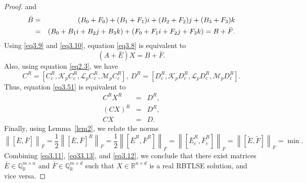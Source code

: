 \documentclass[10pt,a4paper]{amsart}
\def \QR{\mathbb{Q}_\mathbb{R}}
\def \R{{\mathbb R}}
\def \i{\textit{\textbf{i}}}
\def \j{\textit{\textbf{j}}}
\def \k{\textit{\textbf{k}}}
\newcommand\norm[1]{\left\lVert#1\right\rVert}
\begin{document}
\begin{proof}
	and
	\begin{eqnarray}
		\bar{B}&=& (B_0+ F_0)+ (B_1+ F_1)\i+ (B_2+ F_2)\j+ (B_3+ F_3)\k \nonumber\\
		&=& (B_0+ B_1\i+ B_2\j+ B_3\k)+ (F_0 + F_1\i+ F_2\j+ F_3\k) = B+ \bar{F}. \label{eq3.10}
	\end{eqnarray}
	Using \eqref{eq3.9} and \eqref{eq3.10}, equation \eqref{eq3.8} is equivalent to
	\begin{equation} \label{eq3.11}
		(A+\bar{E})X= B+ \bar{F}.
	\end{equation}
	Also, using equation \eqref{eq2.3}, we have
	\begin{equation*}
		C^R = \left[C^R_c, \mathcal{K}_p C^R_c, \mathcal{L}_p C^R_c, \mathcal{M}_p C^R_c\right], ~ D^R=\left[D^R_c, \mathcal{K}_p D^R_c, \mathcal{L}_p D^R_c, \mathcal{M}_p D^R_c\right].
	\end{equation*}
Thus, equation \eqref{eq3.51} is equivalent to
	\begin{eqnarray}
		C^R X^R&=& D^R, \nonumber\\
		(CX)^R&=& D^R, \nonumber\\
		CX&=& D. \label{eq33.13}
	\end{eqnarray}
	Finally, using Lemma~\ref{lem2}, we relate the norms 
	\begin{equation}\label{eq3.12}
		\norm{[\bar{E}, \bar{F}]}_F= \frac{1}{2} \norm{[\bar{E}, \bar{F}]^R}_F= \frac{1}{2} \norm{[\bar{E}^R, \bar{F}^R]}_F =\norm{[\bar{E}^R_c, \bar{F}^R_c]}_F=  \norm{[\widetilde{E}, \widetilde{F}]}_F= \min.  
	\end{equation}
	Combining \eqref{eq3.11}, \eqref{eq33.13}, and \eqref{eq3.12}, we conclude that there exist matrices $\bar{E} \in \QR^{m \times n}$ and $\bar{F} \in \QR^{m \times d}$ such that
	$X  \in  \R^{n \times d}$ is a real RBTLSE solution, and vice versa.
\end{proof}
\end{document}
